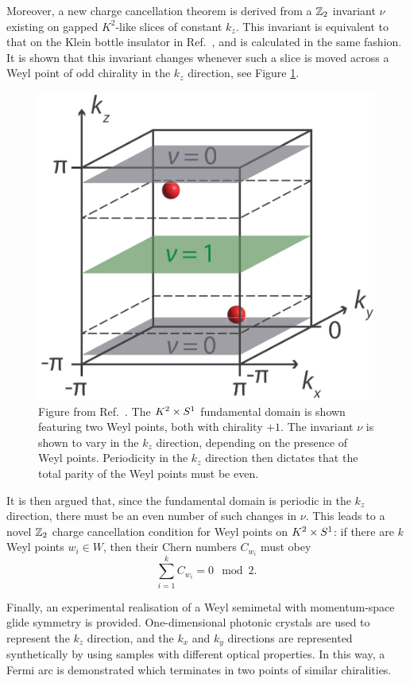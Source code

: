 Moreover, a new charge cancellation theorem is derived from a $\mathbb{Z}_2$ invariant $\nu$ existing on gapped $K^2$-like slices of constant $k_z$. This invariant is equivalent to that on the Klein bottle insulator in Ref.~\cite{CYZ_Klein-gauge}, and is calculated in the same fashion. It is shown that this invariant changes whenever such a slice is moved across a Weyl point of odd chirality in the $k_z$ direction, see Figure \ref{fig:Z2-cancellation}.
\begin{figure}[htb!]
	\centering
	\includegraphics[width=.5\linewidth]{Images/Z2-cancellation}
	\caption{Figure from Ref.~\cite{Fonseca-Vaidya_nonorientable}. The $K^2\times S^1$ fundamental domain is shown featuring two Weyl points, both with chirality $+1$. The invariant $\nu$ is shown to vary in the $k_z$ direction, depending on the presence of Weyl points. Periodicity in the $k_z$ direction then dictates that the total parity of the Weyl points must be even.}
	\label{fig:Z2-cancellation}
\end{figure}
It is then argued that, since the fundamental domain is periodic in the $k_z$ direction, there must be an even number of such changes in $\nu$. This leads to a novel $\mathbb{Z}_2$ charge cancellation condition for Weyl points on $K^2\times S^1$: if there are $k$ Weyl points $w_i\in W$, then their Chern numbers $C_{w_i}$ must obey
\begin{equation}\label{eq:Z2-cancellation}
	\sum_{i=1}^{k}C_{w_i} = 0 \mod 2.
\end{equation}

Finally, an experimental realisation of a Weyl semimetal with momentum-space glide symmetry is provided. One-dimensional photonic crystals are used to represent the $k_z$ direction, and the $k_x$ and $k_y$ directions are represented synthetically by using samples with different optical properties. In this way, a Fermi arc is demonstrated which terminates in two points of similar chiralities.



